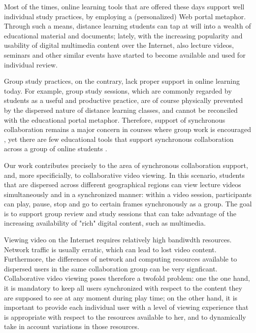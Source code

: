 \documentclass{sig-alternate}
\begin{document}
Most of the times, online learning tools that are offered these days
support well individual study practices, by employing a (personalized)
Web portal metaphor.  Through such a means, distance learning students
can tap at will into a wealth of educational material and documents;
lately, with the increasing popularity and usability of digital
multimedia content over the Internet, also lecture videos, seminars
and other similar events have started to become available and used for
individual review.

Group study practices, on the contrary, lack proper support in online
learning today.  For example, group study sessions, which are commonly
regarded by students as a useful and productive practice, are of
course physically prevented by the dispersed nature of distance
learning classes, and cannot be reconciled with the educational portal
metaphor. Therefore, support of synchronous collaboration remains a
major concern in courses where group work is encouraged \cite{WELLS},
yet there are few educational tools that support synchronous
collaboration across a group of online students \cite{BURGESS}.

Our work contributes precisely to the area of synchronous
collaboration support, and, more specificially, to collaborative video
viewing.  In this scenario, students that are dispersed across
different geographical regions can view lecture videos simultaneously
and in a synchronized manner: within a video session, participants can
play, pause, stop and go to certain frames synchronously as a
group. The goal is to support group review and study sessions that can
take advantage of the increasing availability of "rich" digital
content, such as multimedia.

Viewing video on the Internet requires relatively high bandiwdth
resources.  Network traffic is usually erratic, which can lead to lost
video content. Furthermore, the differences of network and computing
resources available to dispersed users in the same collaboration group
can be very signficant.  Collaborative video viewing poses therefore a
twofold problem: one the one hand, it is mandatory to keep all users
synchronized with respect to the content they are supposed to see at
any moment during play time; on the other hand, it is important to
provide each individual user with a level of viewing experience that
is appropriate with respect to the resources available to her, and to
dynamically take in account variations in those resources.
\end{document}
